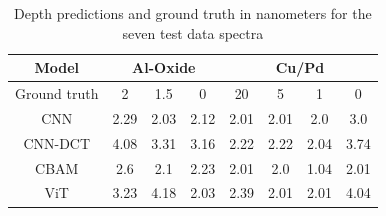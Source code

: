 \begin{table}[H]
    \centering
    \begin{tabular}{c|c|c|c|c|c|c|c|}
        Model  &    \multicolumn{3}{|c|}{Al-Oxide}     & \multicolumn{4}{c}{Cu/Pd}            \\
        \hline
Ground truth   &       2   &   1.5   &  0   & 20   & 5    & 1     & 0                               \\
\hline
CNN            &    2.29   &  2.03  & 2.12  & 2.01  &  2.01 & 2.0   & 3.0                                \\
CNN-DCT        &    4.08   &  3.31  & 3.16  & 2.22 &  2.22 & 2.04  & 3.74                                 \\
CBAM           &    2.6    &  2.1   & 2.23  & 2.01 &  2.0  & 1.04  & 2.01                                \\
ViT            &    3.23   &  4.18  & 2.03  & 2.39 &  2.01 & 2.01  & 4.04                               \\

    \end{tabular}
    \caption{Depth predictions and ground truth in nanometers for the seven test data spectra}
    \label{tab:acc_depth}
\end{table}
